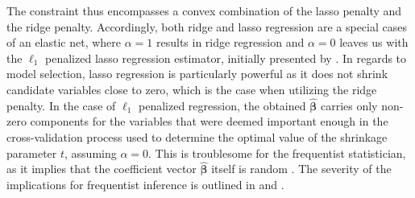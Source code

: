 \documentclass[a4paper,12pt, headsepline]{scrartcl}
\numberwithin{equation}{section}
\begin{document}
The constraint thus encompasses a convex combination of the lasso penalty and the ridge penalty. Accordingly, both ridge and lasso regression are a special cases of an elastic net, where $\alpha = 1$ results in ridge regression and $\alpha = 0$ leaves us with the $\ell_1$ penalized lasso regression estimator, initially presented by \citet{tibshirani96}. In regards to model selection, lasso regression is particularly powerful as it does not shrink candidate variables close to zero, which is the case when utilizing the ridge penalty. In the case of $\ell_1$ penalized regression, the obtained $\bm{\hat{\beta}}$ carries only non-zero components for the variables that were deemed important enough in the cross-validation process used to determine the optimal value of the shrinkage parameter $t$, assuming $\alpha = 0$. This is troublesome for the frequentist statistician, as it implies that the coefficient vector $\bm{\hat{\beta}}$ itself is random \citep{Lee2016}. The severity of the implications for frequentist inference is outlined in \citet{benjamini05} and \citet{benjamini09}.
\end{document}
